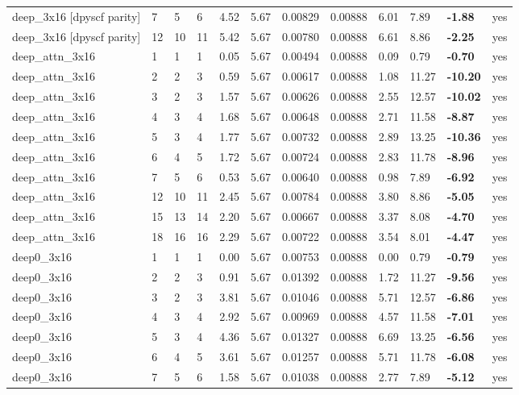 \documentclass[10pt,a4paper]{article}
\begin{document}
\begin{landscape}
\begin{scriptsize}
\begin{longtable}{llllllllllll}
deep\_3x16 [dpyscf parity] & 7 & 5 & 6 & 4.52 & 5.67 & 0.00829 & 0.00888 & 6.01 & 7.89 & \textbf{-1.88} & yes \\
deep\_3x16 [dpyscf parity] & 12 & 10 & 11 & 5.42 & 5.67 & 0.00780 & 0.00888 & 6.61 & 8.86 & \textbf{-2.25} & yes \\
deep\_attn\_3x16 & 1 & 1 & 1 & 0.05 & 5.67 & 0.00494 & 0.00888 & 0.09 & 0.79 & \textbf{-0.70} & yes \\
deep\_attn\_3x16 & 2 & 2 & 3 & 0.59 & 5.67 & 0.00617 & 0.00888 & 1.08 & 11.27 & \textbf{-10.20} & yes \\
deep\_attn\_3x16 & 3 & 2 & 3 & 1.57 & 5.67 & 0.00626 & 0.00888 & 2.55 & 12.57 & \textbf{-10.02} & yes \\
deep\_attn\_3x16 & 4 & 3 & 4 & 1.68 & 5.67 & 0.00648 & 0.00888 & 2.71 & 11.58 & \textbf{-8.87} & yes \\
deep\_attn\_3x16 & 5 & 3 & 4 & 1.77 & 5.67 & 0.00732 & 0.00888 & 2.89 & 13.25 & \textbf{-10.36} & yes \\
deep\_attn\_3x16 & 6 & 4 & 5 & 1.72 & 5.67 & 0.00724 & 0.00888 & 2.83 & 11.78 & \textbf{-8.96} & yes \\
deep\_attn\_3x16 & 7 & 5 & 6 & 0.53 & 5.67 & 0.00640 & 0.00888 & 0.98 & 7.89 & \textbf{-6.92} & yes \\
deep\_attn\_3x16 & 12 & 10 & 11 & 2.45 & 5.67 & 0.00784 & 0.00888 & 3.80 & 8.86 & \textbf{-5.05} & yes \\
deep\_attn\_3x16 & 15 & 13 & 14 & 2.20 & 5.67 & 0.00667 & 0.00888 & 3.37 & 8.08 & \textbf{-4.70} & yes \\
deep\_attn\_3x16 & 18 & 16 & 16 & 2.29 & 5.67 & 0.00722 & 0.00888 & 3.54 & 8.01 & \textbf{-4.47} & yes \\
deep0\_3x16 & 1 & 1 & 1 & 0.00 & 5.67 & 0.00753 & 0.00888 & 0.00 & 0.79 & \textbf{-0.79} & yes \\
deep0\_3x16 & 2 & 2 & 3 & 0.91 & 5.67 & 0.01392 & 0.00888 & 1.72 & 11.27 & \textbf{-9.56} & yes \\
deep0\_3x16 & 3 & 2 & 3 & 3.81 & 5.67 & 0.01046 & 0.00888 & 5.71 & 12.57 & \textbf{-6.86} & yes \\
deep0\_3x16 & 4 & 3 & 4 & 2.92 & 5.67 & 0.00969 & 0.00888 & 4.57 & 11.58 & \textbf{-7.01} & yes \\
deep0\_3x16 & 5 & 3 & 4 & 4.36 & 5.67 & 0.01327 & 0.00888 & 6.69 & 13.25 & \textbf{-6.56} & yes \\
deep0\_3x16 & 6 & 4 & 5 & 3.61 & 5.67 & 0.01257 & 0.00888 & 5.71 & 11.78 & \textbf{-6.08} & yes \\
deep0\_3x16 & 7 & 5 & 6 & 1.58 & 5.67 & 0.01038 & 0.00888 & 2.77 & 7.89 & \textbf{-5.12} & yes \\

\end{longtable}
\end{scriptsize}
\end{landscape}
\end{document}
